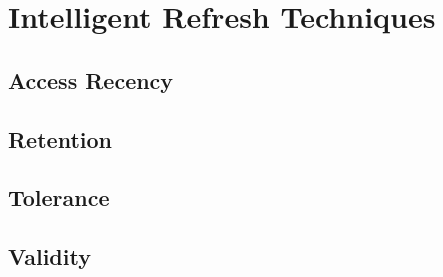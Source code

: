 \section{Intelligent Refresh Techniques} 
\label{sec:int}

\subsection{Access Recency}


\subsection{Retention}


\subsection{Tolerance}


\subsection{Validity}